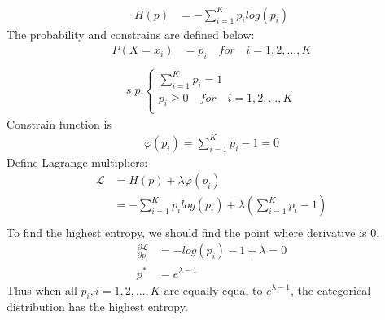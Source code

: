 \documentclass{article}
\begin{document}
\begin{itemize}
\begin{align*}
    H(p) &= -\sum_{i = 1}^K p_{i}log(p_{i})
\end{align*}
The probability and constrains are defined below:\\
\begin{align*}
    P(X = x_{i}) &= p_{i}\quad for\quad i = 1, 2, ..., K\\
\end{align*}
\begin{align*}
    s.p.\left\{
\begin{aligned}
\sum_{i = 1}^K p_{i} = 1\\
p_{i} \geq 0 \quad for\quad i = 1, 2, ..., K\\
\end{aligned}
\right.
\end{align*}
Constrain function is
\begin{align*}
    \varphi (p_{i}) = \sum_{i = 1}^K p_{i} - 1= 0
\end{align*}
Define Lagrange multipliers:\\
\begin{align*}
    \mathcal{L} &= H(p) + \lambda \varphi(p_{i})\\
    &= -\sum_{i = 1}^K p_{i}log(p_{i}) + \lambda (\sum_{i = 1}^K p_{i} - 1)\\
\end{align*}
To find the highest entropy, we should find the point where derivative is 0.\\
\begin{align*}
    \frac{\partial \mathcal{L}}{\partial p_{i}} &= -log(p_{i}) - 1 + \lambda = 0\\
    p^* &= e^{\lambda - 1}
\end{align*}
Thus when all $p_{i}, i = 1, 2, ..., K$ are equally equal to $e^{\lambda - 1}$, the categorical distribution has the highest entropy.
\end{itemize} 
\end{document}
